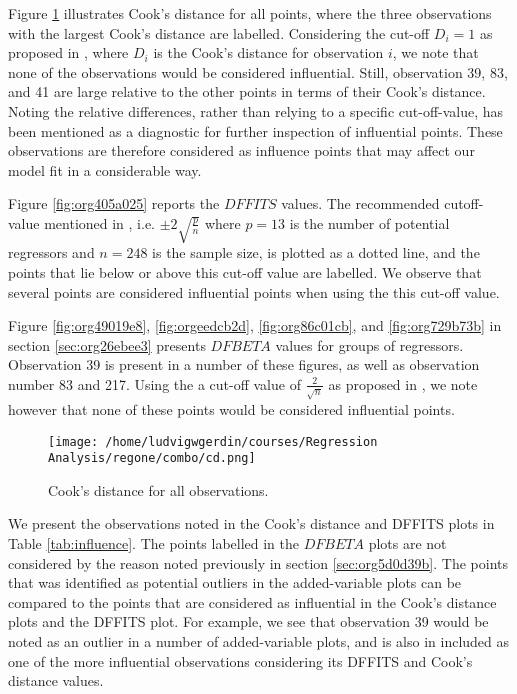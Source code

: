 \documentclass[11pt]{article}
\begin{document}


Figure \ref{fig:orgb9a8c6f} illustrates Cook's distance for all points, where the three observations with the largest 
Cook's distance are labelled. Considering the cut-off \(D_i = 1\) as proposed in \cite{Montgomery2012}, 
where \(D_i\) is the Cook's distance for observation \(i\), we note that none of the observations would be 
considered influential. Still, observation 39, 83, and 41 are large relative
to the other points in terms of their Cook's distance. Noting the relative differences, rather 
than relying to a specific cut-off-value, has been mentioned as a diagnostic for further
inspection of influential points. \cite{Fox1991} These observations are therefore considered as influence
points that may affect our model fit in a considerable way.

Figure \ref{fig:org405a025} reports the \(DFFITS\) values. 
The recommended cutoff-value mentioned in \cite{Montgomery2012}, i.e. \(\pm 2\sqrt{\frac{p}{n}}\)
where \(p = 13\) is the number of potential regressors and \(n = 248\) is the sample size, is 
plotted as a dotted line, and the points that lie below or above this cut-off value are labelled.
We observe that several points are considered influential points when using the this cut-off value.

Figure \ref{fig:org49019e8}, \ref{fig:orgeedcb2d}, \ref{fig:org86c01cb}, and
\ref{fig:org729b73b} in section \ref{sec:org26ebee3} presents \(DFBETA\) values for groups of regressors. 
Observation 39 is present in a number of these figures, as well as observation number 83 and 217. 
Using the a cut-off value of \(\frac{2}{\sqrt{n}}\) as proposed in \cite{Montgomery2012}, we note however that 
none of these points would be considered influential points.

\begin{figure}[H]
\centering
\texttt{[image: /home/ludvigwgerdin/courses/Regression Analysis/regone/combo/cd.png]}
\caption{\label{fig:orgb9a8c6f}
Cook's distance for all observations.}
\end{figure}

We present the observations noted in the Cook's distance and DFFITS plots in Table \ref{tab:influence}.
The points labelled in the \(DFBETA\) plots are not considered by the reason noted previously 
in section \ref{sec:org5d0d39b}. The points that was identified as potential outliers in the added-variable
plots can be compared to the points that are considered as influential in the Cook's distance plots
and the DFFITS plot. For example, we see that observation 39 would be noted as an outlier in a number of 
added-variable plots, and is also in included as one of the more influential observations considering 
its DFFITS and Cook's distance values.
\end{document}
